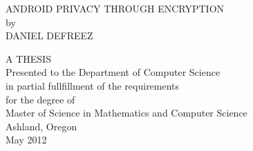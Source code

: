 \thispagestyle{empty}	%

\singlespacing
\begin{center}

ANDROID PRIVACY THROUGH ENCRYPTION \\[2.25in]
by \\[0.25in]
DANIEL DEFREEZ

\vfill

A THESIS \\[0.25in]
Presented to the Department of Computer Science \\
in partial fullfillment of the requirements \\
for the degree of \\[0.25in]
Master of Science in Mathematics and Computer Science \\[0.25in]

Ashland, Oregon \\
May 2012

\end{center}
